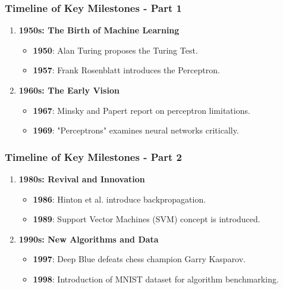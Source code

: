 \documentclass{beamer}
\begin{document}
\begin{frame}[fragile]
    \frametitle{Timeline of Key Milestones - Part 1}
    \begin{enumerate}
        \item \textbf{1950s: The Birth of Machine Learning}
            \begin{itemize}
                \item \textbf{1950}: Alan Turing proposes the Turing Test.
                \item \textbf{1957}: Frank Rosenblatt introduces the Perceptron.
            \end{itemize}
        \item \textbf{1960s: The Early Vision}
            \begin{itemize}
                \item \textbf{1967}: Minsky and Papert report on perceptron limitations.
                \item \textbf{1969}: "Perceptrons" examines neural networks critically.
            \end{itemize}
    \end{enumerate}
\end{frame}

\begin{frame}[fragile]
    \frametitle{Timeline of Key Milestones - Part 2}
    \begin{enumerate}
        \item \textbf{1980s: Revival and Innovation}
            \begin{itemize}
                \item \textbf{1986}: Hinton et al. introduce backpropagation.
                \item \textbf{1989}: Support Vector Machines (SVM) concept is introduced.
            \end{itemize}
        \item \textbf{1990s: New Algorithms and Data}
            \begin{itemize}
                \item \textbf{1997}: Deep Blue defeats chess champion Garry Kasparov.
                \item \textbf{1998}: Introduction of MNIST dataset for algorithm benchmarking.
            \end{itemize}
    \end{enumerate}
\end{frame}
\end{document}
